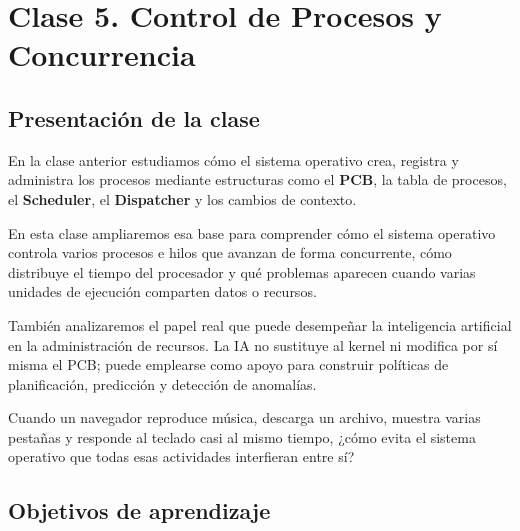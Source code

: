 \documentclass[
  spanish,
  letterpaper,
]{scrbook}
\begin{document}

\chapter{Clase 5. Control de Procesos y
Concurrencia}\label{clase-5.-control-de-procesos-y-concurrencia-1}

\section{Presentación de la clase}\label{presentaciuxf3n-de-la-clase-3}

En la clase anterior estudiamos cómo el sistema operativo crea, registra
y administra los procesos mediante estructuras como el \textbf{PCB}, la
tabla de procesos, el \textbf{Scheduler}, el \textbf{Dispatcher} y los
cambios de contexto.

En esta clase ampliaremos esa base para comprender cómo el sistema
operativo controla varios procesos e hilos que avanzan de forma
concurrente, cómo distribuye el tiempo del procesador y qué problemas
aparecen cuando varias unidades de ejecución comparten datos o recursos.

También analizaremos el papel real que puede desempeñar la inteligencia
artificial en la administración de recursos. La IA no sustituye al
kernel ni modifica por sí misma el PCB; puede emplearse como apoyo para
construir políticas de planificación, predicción y detección de
anomalías.

\begin{tcolorbox}[enhanced jigsaw, arc=.35mm, bottomrule=.15mm, bottomtitle=1mm, breakable, colback=white, colbacktitle=quarto-callout-note-color!10!white, colframe=quarto-callout-note-color-frame, coltitle=black, left=2mm, leftrule=.75mm, opacityback=0, opacitybacktitle=0.6, rightrule=.15mm, title=\textcolor{quarto-callout-note-color}{\faInfo}\hspace{0.5em}{Pregunta detonadora}, titlerule=0mm, toprule=.15mm, toptitle=1mm]

Cuando un navegador reproduce música, descarga un archivo, muestra
varias pestañas y responde al teclado casi al mismo tiempo, ¿cómo evita
el sistema operativo que todas esas actividades interfieran entre sí?

\end{tcolorbox}

\section{Objetivos de aprendizaje}\label{objetivos-de-aprendizaje-3}
\end{document}
